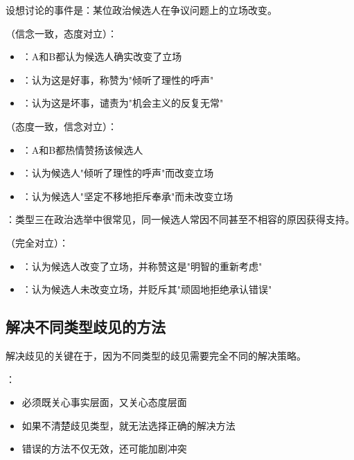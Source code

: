\begin{examplebox}[title=政治候选人立场变化的案例分析]
设想讨论的事件是：某位政治候选人在争议问题上的立场改变。

（信念一致，态度对立）：
\begin{itemize}
  \item {}：A和B都认为候选人确实改变了立场
  \item {}：认为这是好事，称赞为"倾听了理性的呼声"
  \item {}：认为这是坏事，谴责为"机会主义的反复无常"
\end{itemize}

（态度一致，信念对立）：
\begin{itemize}
  \item {}：A和B都热情赞扬该候选人
  \item {}：认为候选人"倾听了理性的呼声"而改变立场
  \item {}：认为候选人"坚定不移地拒斥奉承"而未改变立场
\end{itemize}

：类型三在政治选举中很常见，同一候选人常因不同甚至不相容的原因获得支持。

（完全对立）：
\begin{itemize}
  \item {}：认为候选人改变了立场，并称赞这是"明智的重新考虑"
  \item {}：认为候选人未改变立场，并贬斥其"顽固地拒绝承认错误"
\end{itemize}
\end{examplebox}

\subsection{解决不同类型歧见的方法}

\begin{theorembox}[title=歧见解决的基本原则]
解决歧见的关键在于，因为不同类型的歧见需要完全不同的解决策略。

：
\begin{itemize}
  \item 必须既关心事实层面，又关心态度层面
  \item 如果不清楚歧见类型，就无法选择正确的解决方法
  \item 错误的方法不仅无效，还可能加剧冲突
\end{itemize}
\end{theorembox}

